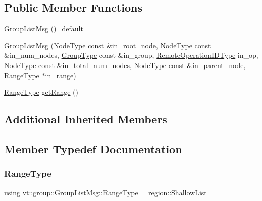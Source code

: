 \subsection*{Public Member Functions}
\begin{DoxyCompactItemize}
\item 
\hyperlink{structvt_1_1group_1_1_group_list_msg_ac5ba827f5a09281a5503ef38495ff773}{Group\+List\+Msg} ()=default
\item 
\hyperlink{structvt_1_1group_1_1_group_list_msg_a838328cf3221734f9480ba758e6bf9f2}{Group\+List\+Msg} (\hyperlink{namespacevt_a866da9d0efc19c0a1ce79e9e492f47e2}{Node\+Type} const \&in\+\_\+root\+\_\+node, \hyperlink{namespacevt_a866da9d0efc19c0a1ce79e9e492f47e2}{Node\+Type} const \&in\+\_\+num\+\_\+nodes, \hyperlink{namespacevt_a27b5e4411c9b6140c49100e050e2f743}{Group\+Type} const \&in\+\_\+group, \hyperlink{namespacevt_1_1group_a73f2624ddeb535b39a08b6524f26b244}{Remote\+Operation\+I\+D\+Type} in\+\_\+op, \hyperlink{namespacevt_a866da9d0efc19c0a1ce79e9e492f47e2}{Node\+Type} const \&in\+\_\+total\+\_\+num\+\_\+nodes, \hyperlink{namespacevt_a866da9d0efc19c0a1ce79e9e492f47e2}{Node\+Type} const \&in\+\_\+parent\+\_\+node, \hyperlink{structvt_1_1group_1_1_group_list_msg_a4b6524168e2e6f3308b1957083fafb45}{Range\+Type} $\ast$in\+\_\+range)
\item 
\hyperlink{structvt_1_1group_1_1_group_list_msg_a4b6524168e2e6f3308b1957083fafb45}{Range\+Type} \hyperlink{structvt_1_1group_1_1_group_list_msg_aab715b868388f6aaeb38e369a1b0843c}{get\+Range} ()
\end{DoxyCompactItemize}
\subsection*{Additional Inherited Members}


\subsection{Member Typedef Documentation}
\mbox{\label{structvt_1_1group_1_1_group_list_msg_a4b6524168e2e6f3308b1957083fafb45}} 
\subsubsection{\texorpdfstring{Range\+Type}{RangeType}}
{\footnotesize\ttfamily using \hyperlink{structvt_1_1group_1_1_group_list_msg_a4b6524168e2e6f3308b1957083fafb45}{vt\+::group\+::\+Group\+List\+Msg\+::\+Range\+Type} =  \hyperlink{structvt_1_1group_1_1region_1_1_shallow_list}{region\+::\+Shallow\+List}}



